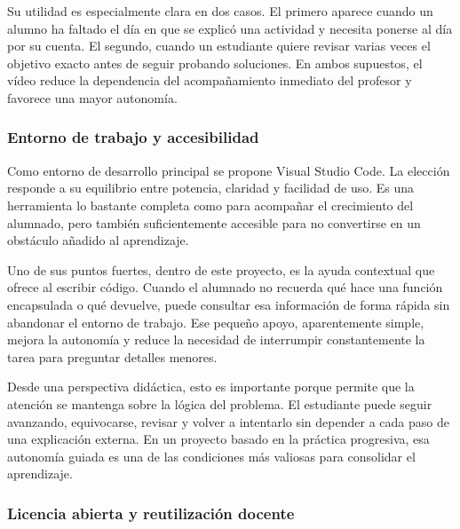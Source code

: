 \documentclass[a4paper,12pt]{article}
\begin{document}
Su utilidad es especialmente clara en dos casos. El primero aparece cuando un alumno ha faltado el día en que se explicó una actividad y necesita ponerse al día por su cuenta. El segundo, cuando un estudiante quiere revisar varias veces el objetivo exacto antes de seguir probando soluciones. En ambos supuestos, el vídeo reduce la dependencia del acompañamiento inmediato del profesor y favorece una mayor autonomía.


\subsubsection{Entorno de trabajo y accesibilidad}

Como entorno de desarrollo principal se propone Visual Studio Code\cite{vscode}. La elección responde a su equilibrio entre potencia, claridad y facilidad de uso. Es una herramienta lo bastante completa como para acompañar el crecimiento del alumnado, pero también suficientemente accesible para no convertirse en un obstáculo añadido al aprendizaje.

Uno de sus puntos fuertes, dentro de este proyecto, es la ayuda contextual que ofrece al escribir código. Cuando el alumnado no recuerda qué hace una función encapsulada o qué devuelve, puede consultar esa información de forma rápida sin abandonar el entorno de trabajo. Ese pequeño apoyo, aparentemente simple, mejora la autonomía y reduce la necesidad de interrumpir constantemente la tarea para preguntar detalles menores.

Desde una perspectiva didáctica, esto es importante porque permite que la atención se mantenga sobre la lógica del problema. El estudiante puede seguir avanzando, equivocarse, revisar y volver a intentarlo sin depender a cada paso de una explicación externa. En un proyecto basado en la práctica progresiva, esa autonomía guiada es una de las condiciones más valiosas para consolidar el aprendizaje.

\subsubsection{Licencia abierta y reutilización docente}
\end{document}
